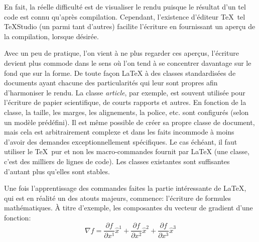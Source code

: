 	En fait, la réelle difficulté est de visualiser le rendu puisque le résultat d'un tel code est connu qu'après compilation. Cependant, l'existence d'éditeur \TeX~tel TeXStudio (un parmi tant d'autres) facilite l'écriture en fournissant un aperçu de la compilation, lorsque désirée.
	\par Avec un peu de pratique, l'on vient à ne plus regarder ces aperçus, l'écriture devient plus commode dans le sens où l'on tend à se concentrer davantage sur le fond que sur la forme. De toute façon \LaTeX{} à des classes standardisées de documents ayant chacune des particularités qui leur sont propres afin d'harmoniser le rendu. La classe \textit{article}, par exemple, est souvent utilisée pour l'écriture de papier scientifique, de courts rapports et autres. En fonction de la classe, la taille, les marges, les alignements, la police, etc. sont configurés (selon un modèle prédéfini). Il est même possible de créer sa propre classe de document, mais cela est arbitrairement complexe et dans les faits incommode à moins d'avoir des demandes exceptionnellement spécifiques. Le cas échéant, il faut utiliser le \TeX~pur et non les macro-commandes fournit par \LaTeX{} (une classe, c'est des milliers de lignes de code). Les classes existantes sont suffisantes d'autant plus qu'elles sont stables. 
	\par Une fois l'apprentissage des commandes faites la partie intéressante de \LaTeX, qui est en réalité un des atouts majeurs, commence: l'écriture de formules mathématiques. À titre d'exemple, les composantes du vecteur de gradient d'une fonction:
	\begin{equation}\label{eq:exemple}
	\nabla f =%
	\frac{\partial f}{\partial x^1}\widehat{x}^1%
	+\frac{\partial f}{\partial x^2}\widehat{x}^2%
	+\frac{\partial f}{\partial x^3}\widehat{x}^3
	\end{equation}
